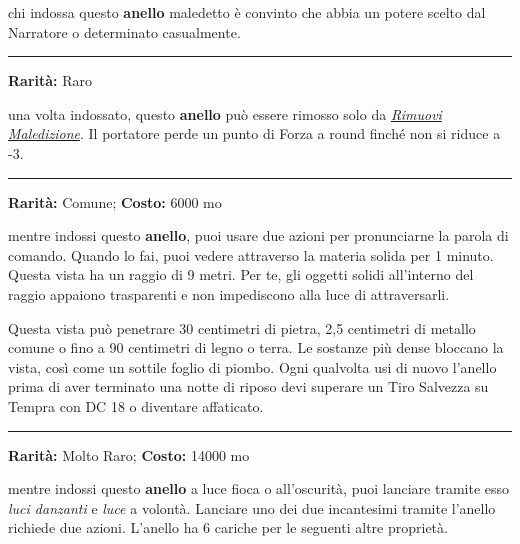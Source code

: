 \begin{multicols}{2}
chi indossa questo \textbf{anello} maledetto è convinto che abbia un potere scelto dal Narratore o determinato casualmente.

\smallskip\noindent\rule{\linewidth}{2pt}  \hypertarget{AnellodellaDebolezza}{}\smallskip{}\noindent\label{AnellodellaDebolezza}

\textbf{Rarità:} Raro

una volta indossato, questo \textbf{anello} può essere rimosso solo da \emph{\hyperlink{Rimuovi Maledizione}{Rimuovi Maledizione}}. Il portatore perde un punto di Forza a round finché non si riduce a -3.

\smallskip\noindent\rule{\linewidth}{2pt}  \hypertarget{AnellodellaVistaaiRaggiX}{}\smallskip{}\noindent\label{AnellodellaVistaaiRaggiX}

\textbf{Rarità:} Comune; \textbf{Costo:} 6000 mo

mentre indossi questo \textbf{anello}, puoi usare due azioni per pronunciarne la parola di comando. Quando lo fai, puoi vedere attraverso la materia solida per 1 minuto. Questa vista ha un raggio di 9 metri. Per te, gli oggetti solidi all'interno del raggio appaiono trasparenti e non impediscono alla luce di attraversarli.

Questa vista può penetrare 30 centimetri di pietra, 2,5 centimetri di metallo comune o fino a 90 centimetri di legno o terra. Le sostanze più dense bloccano la vista, così come un sottile foglio di piombo. Ogni qualvolta usi di nuovo l'anello prima di aver terminato una notte di riposo devi superare un Tiro Salvezza su Tempra con DC 18 o diventare affaticato.

\smallskip\noindent\rule{\linewidth}{2pt}  \hypertarget{AnellodelleStelleCadenti}{}\smallskip{}\noindent\label{AnellodelleStelleCadenti}

\textbf{Rarità:} Molto Raro; \textbf{Costo:} 14000 mo

mentre indossi questo \textbf{anello} a luce fioca o all'oscurità, puoi lanciare tramite esso \emph{luci danzanti} e \emph{luce} a volontà. Lanciare uno dei due incantesimi tramite l'anello richiede due azioni. L'anello ha 6 cariche per le seguenti altre proprietà.


\end{multicols}
